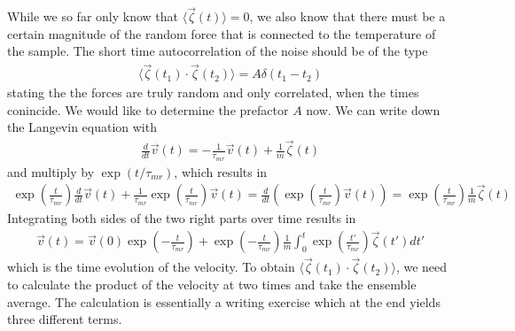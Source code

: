 \documentclass[letterpaper,10pt,english]{sphinxmanual}
\begin{document}
\sphinxAtStartPar
While we so far only know that \(\langle\vec{\zeta}(t) \rangle =0\), we also know that there must be a certain magnitude of the random force that is connected to the temperature of the sample. The short time autocorrelation of the noise should be of the type
\begin{equation*}
\begin{split}\langle\vec{\zeta}(t_1)\cdot \vec{\zeta}(t_2) \rangle =A\delta (t_1-t_2)\end{split}
\end{equation*}
\sphinxAtStartPar
stating the the forces are truly random and only correlated, when the times conincide. We would like to determine the prefactor \(A\) now. We can write down the Langevin equation with
\begin{equation*}
\begin{split}\frac{d}{dt}\vec{v}(t)=-\frac{1}{\tau_{mr}}\vec{v}(t)+\frac{1}{m}\vec{\zeta}(t)\end{split}
\end{equation*}
\sphinxAtStartPar
and multiply by \(\exp(t/\tau_{mr})\), which results in
\begin{equation*}
\begin{split}\exp\left (\frac{t}{\tau_{mr}}\right )\frac{d}{dt}\vec{v}(t)+\frac{1}{\tau_{mr}}\exp\left (\frac{t}{\tau_{mr}}\right )\vec{v}(t)=\frac{d}{dt}\left (\exp\left (\frac{t}{\tau_{mr}}\right )\vec{v}(t) \right )=\exp\left(\frac{t}{\tau_{mr}}\right )\frac{1}{m}\vec{\zeta}(t)\end{split}
\end{equation*}
\sphinxAtStartPar
Integrating both sides of the two right parts over time results in
\begin{equation*}
\begin{split}\vec{v}(t)=\vec{v}(0)\exp \left (-\frac{t}{\tau_{mr}} \right )+\exp \left (-\frac{t}{\tau_{mr}} \right )\frac{1}{m}\int_0^t \exp \left (\frac{t'}{\tau_{mr}} \right )\vec{\zeta}(t')dt'\end{split}
\end{equation*}
\sphinxAtStartPar
which is the time evolution of the velocity. To obtain \(\langle\vec{\zeta}(t_1)\cdot \vec{\zeta}(t_2) \rangle\), we need to calculate the product of the velocity at two times and take the ensemble average. The calculation is essentially a writing exercise which at the end yields three different terms.
\end{document}
